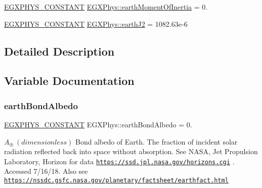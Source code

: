 \begin{DoxyCompactItemize}
\item 
\mbox{\hyperlink{group___e_g_x_phys-_constants-_macros_ga76980d288494ce1714c9ac68a95ba702}{E\+G\+X\+P\+H\+Y\+S\+\_\+\+C\+O\+N\+S\+T\+A\+NT}} \mbox{\hyperlink{group___e_g_x_phys-_constants-_astrophysics-_solar_system-_earth-_bulk_ga4b3a512e9d562530710100f65695ab13}{E\+G\+X\+Phys\+::earth\+Moment\+Of\+Inertia}} = 0.
\item 
\mbox{\hyperlink{group___e_g_x_phys-_constants-_macros_ga76980d288494ce1714c9ac68a95ba702}{E\+G\+X\+P\+H\+Y\+S\+\_\+\+C\+O\+N\+S\+T\+A\+NT}} \mbox{\hyperlink{group___e_g_x_phys-_constants-_astrophysics-_solar_system-_earth-_bulk_ga8d661a52948229a59e9eabf97af51faf}{E\+G\+X\+Phys\+::earth\+J2}} = 1082.\+63e-\/6
\end{DoxyCompactItemize}


\subsection{Detailed Description}


\subsection{Variable Documentation}
\mbox{\label{group___e_g_x_phys-_constants-_astrophysics-_solar_system-_earth-_bulk_gad71c87a7e90df69eed292f9a54376fff}} 
\subsubsection{\texorpdfstring{earth\+Bond\+Albedo}{earthBondAlbedo}}
{\footnotesize\ttfamily \mbox{\hyperlink{group___e_g_x_phys-_constants-_macros_ga76980d288494ce1714c9ac68a95ba702}{E\+G\+X\+P\+H\+Y\+S\+\_\+\+C\+O\+N\+S\+T\+A\+NT}} E\+G\+X\+Phys\+::earth\+Bond\+Albedo = 0.}

$ A_{\oplus} \ (dimensionless)$ Bond albedo of Earth. The fraction of incident solar radiation reflected back into space without absorption. See N\+A\+SA, Jet Propulsion Laboratory, Horizon for data \href{https://ssd.jpl.nasa.gov/horizons.cgi}{\tt https\+://ssd.\+jpl.\+nasa.\+gov/horizons.\+cgi} . Accessed 7/16/18. Also see \href{https://nssdc.gsfc.nasa.gov/planetary/factsheet/earthfact.html}{\tt https\+://nssdc.\+gsfc.\+nasa.\+gov/planetary/factsheet/earthfact.\+html} \mbox{\label{group___e_g_x_phys-_constants-_astrophysics-_solar_system-_earth-_bulk_ga7ff84de93ff11190d3b84d8ff8525c04}} 
